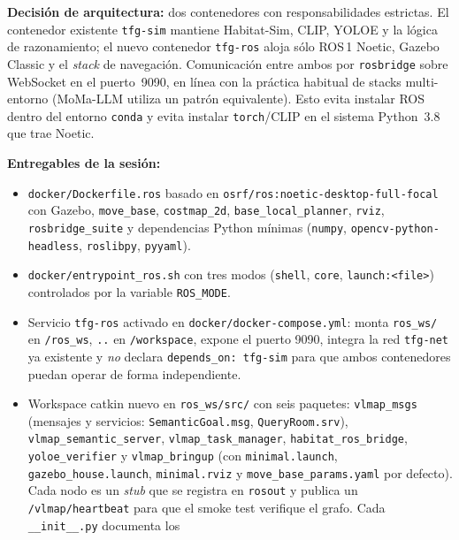 \documentclass[11pt,a4paper]{article}
\begin{document}
\textbf{Decisión de arquitectura:} dos contenedores con
responsabilidades estrictas. El contenedor existente \texttt{tfg-sim}
mantiene Habitat-Sim, CLIP, YOLOE y la lógica de razonamiento; el
nuevo contenedor \texttt{tfg-ros} aloja sólo ROS\,1 Noetic, Gazebo
Classic y el \emph{stack} de navegación. Comunicación entre ambos por
\texttt{rosbridge} sobre WebSocket en el puerto~9090, en línea con la
práctica habitual de stacks multi-entorno (MoMa-LLM utiliza un patrón
equivalente). Esto evita instalar ROS dentro del entorno
\texttt{conda} y evita instalar \texttt{torch}/CLIP en el sistema
Python~3.8 que trae Noetic.

\textbf{Entregables de la sesión:}
\begin{itemize}
  \item \texttt{docker/Dockerfile.ros} basado en
        \texttt{osrf/ros:noetic-desktop-full-focal} con Gazebo,
        \texttt{move\_base}, \texttt{costmap\_2d},
        \texttt{base\_local\_planner}, \texttt{rviz},
        \texttt{rosbridge\_suite} y dependencias Python mínimas
        (\texttt{numpy}, \texttt{opencv-python-headless},
        \texttt{roslibpy}, \texttt{pyyaml}).
  \item \texttt{docker/entrypoint\_ros.sh} con tres modos
        (\texttt{shell}, \texttt{core}, \texttt{launch:<file>})
        controlados por la variable \texttt{ROS\_MODE}.
  \item Servicio \texttt{tfg-ros} activado en
        \texttt{docker/docker-compose.yml}: monta
        \texttt{ros\_ws/} en \texttt{/ros\_ws}, \texttt{..} en
        \texttt{/workspace}, expone el puerto 9090, integra la red
        \texttt{tfg-net} ya existente y \emph{no} declara
        \texttt{depends\_on: tfg-sim} para que ambos contenedores
        puedan operar de forma independiente.
  \item Workspace catkin nuevo en \texttt{ros\_ws/src/} con seis
        paquetes: \texttt{vlmap\_msgs} (mensajes y servicios:
        \texttt{SemanticGoal.msg}, \texttt{QueryRoom.srv}),
        \texttt{vlmap\_semantic\_server},
        \texttt{vlmap\_task\_manager},
        \texttt{habitat\_ros\_bridge},
        \texttt{yoloe\_verifier} y
        \texttt{vlmap\_bringup} (con \texttt{minimal.launch},
        \texttt{gazebo\_house.launch}, \texttt{minimal.rviz} y
        \texttt{move\_base\_params.yaml} por defecto).
        Cada nodo es un \emph{stub} que se registra en \texttt{rosout}
        y publica un \texttt{/vlmap/heartbeat} para que el smoke test
        verifique el grafo. Cada \texttt{\_\_init\_\_.py} documenta los

\end{itemize}
\end{document}
